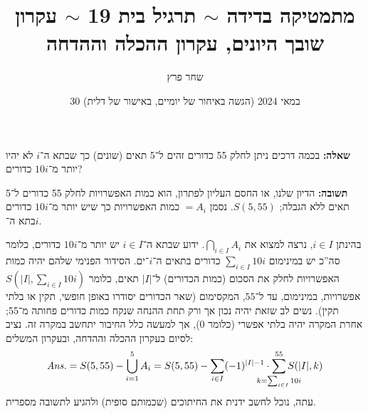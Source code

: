 \documentclass[]{article}
\author{שחר פרץ}
\title{מתמטיקה בדידה $\sim$ תרגיל בית 19 $\sim$ עקרון שובך היונים, עקרון ההכלה וההדחה}
\date{30 במאי 2024 (הגשה באיחור של יומיים, באישור של דלית)}
\newcommand\ans   {\mathit{Ans.}}
\newcommand\cupai[1]  {\bigcup_{i = 1}^{#1} A_i}
\newcommand\capiiai   {\bigcap_{i \in I} A_i}
\begin{document}
	\maketitle
	\section{} %
	\textbf{שאלה: }בכמה דרכים ניתן לחלק 55 כדורים זהים ל־5 תאים (שונים) כך שבתא ה־$i$ לא יהיו יותר מ־$ 10i $ כדורים?
	
		\textbf{תשובה: } הדיון שלנו, או החסם העליון לפתרון, הוא כמות האפשרויות לחלק 55 כדורים ל־5 תאים ללא הגבלה; $S(5, 55)$. 	נסמן $=A_i$ כמות האפשרויות כך שיש יותר מ־$10i$ כדורים בתא ה־$i$. 
		
		בהינתן $i \in I$, נרצה למצוא את $\capiiai$. ידוע שבתא ה־$i \in I$ יש יותר מ־$10i$ כדורים, כלומר סה''כ יש במינימום $\sum_{i \in I} 10i $ כדורים בתאים ה־$i$־ים. הסידור הפנימי שלהם יהיה כמות האפשרויות לחלק את הסכום (כמות הכדורים) ל־$|I|$ תאים, כלומר $S(|I|, \sum_{i \in I} 10i)$ אפשרויות, במינימום, עד ל־$55$, המקסימום (שאר הכדורים יסודרו באופן חופשי, תקין או בלתי תקין). נשים לב שזאת יהיה נכון אך ורק תחת ההנחה שנקח כמות כדורים פחותה מ־55; אחרת המקרה יהיה בלתי אפשרי (כלומר 0), אך למעשה כלל החיבור יתחשב במקרה זה. נציב לסיום בעקרון ההכלה וההדחה, ובעקרון המשלים: 
		\[ \ans = S(5, 55) - \cupai{5} = S(5, 55) - \sum_{i \in I} (-1)^{|I| - 1} \cdot \sum_{\mathclap{k = \sum_{i \in I}10i}}^{55} S(|I|, k) \]
		עתה, נוכל לחשב ידנית את החיתוכים (שכמותם סופית) ולהגיע לתשובה מספרית. 
	
\end{document}
